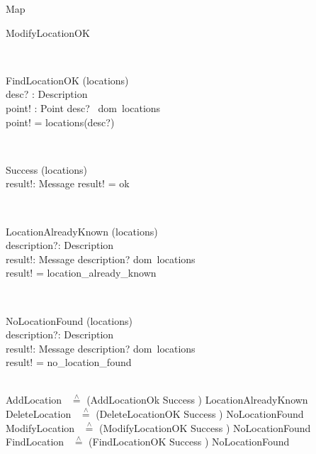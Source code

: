 \documentclass[12pt]{article}
\begin{document}
\begin{spacing}{1.5}
\begin{class}{Map}
\begin{op}{ModifyLocationOK}
\end{op}\\ 
\begin{op}{FindLocationOK}
\Xi (locations) \\
desc? : Description\\
point! : Point
\ST
desc? \in ~dom~locations \\
point! = locations(desc?)
\end{op}\\
\zbreak
\begin{op}{Success}
\Xi (locations) \\
result!: Message
\ST
result! = ok
\end{op}\\
\begin{op}{LocationAlreadyKnown}
\Xi (locations) \\
description?: Description \\
result!: Message
\ST
description? \in dom~locations \\
result! = location\_already\_known
\end{op}\\
\begin{op}{NoLocationFound}
\Xi (locations) \\
description?: Description \\
result!: Message
\ST
description? \notin dom~locations \\
result! = no\_location\_found
\end{op}\\
AddLocation ~$\stackrel{\wedge}{=}$ (AddLocationOk \land Success ) \lor LocationAlreadyKnown
\\
DeleteLocation ~$\stackrel{\wedge}{=}$ (DeleteLocationOK \land Success ) \lor NoLocationFound
\\
ModifyLocation ~$\stackrel{\wedge}{=}$ (ModifyLocationOK \land Success ) \lor NoLocationFound
\\
FindLocation ~$\stackrel{\wedge}{=}$ (FindLocationOK \land Success ) \lor NoLocationFound
\end{class}
\znewpage


\end{spacing}
\end{document}
